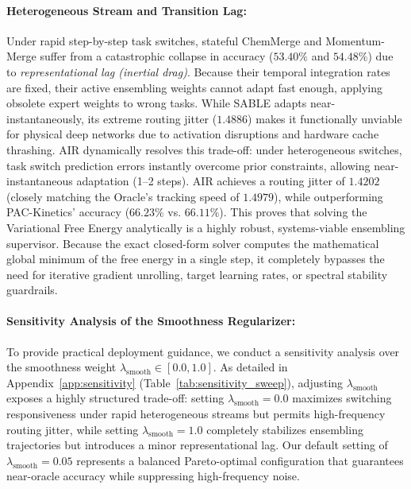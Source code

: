 \paragraph{Heterogeneous Stream and Transition Lag:}
Under rapid step-by-step task switches, stateful ChemMerge and Momentum-Merge suffer from a catastrophic collapse in accuracy ($53.40\%$ and $54.48\%$) due to \emph{representational lag (inertial drag)}. Because their temporal integration rates are fixed, their active ensembling weights cannot adapt fast enough, applying obsolete expert weights to wrong tasks. While SABLE adapts near-instantaneously, its extreme routing jitter ($1.4886$) makes it functionally unviable for physical deep networks due to activation disruptions and hardware cache thrashing. AIR dynamically resolves this trade-off: under heterogeneous switches, task switch prediction errors instantly overcome prior constraints, allowing near-instantaneous adaptation (1--2 steps). AIR achieves a routing jitter of $1.4202$ (closely matching the Oracle's tracking speed of $1.4979$), while outperforming PAC-Kinetics' accuracy ($66.23\%$ vs. $66.11\%$). This proves that solving the Variational Free Energy analytically is a highly robust, systems-viable ensembling supervisor. Because the exact closed-form solver computes the mathematical global minimum of the free energy in a single step, it completely bypasses the need for iterative gradient unrolling, target learning rates, or spectral stability guardrails.

\paragraph{Sensitivity Analysis of the Smoothness Regularizer:}
To provide practical deployment guidance, we conduct a sensitivity analysis over the smoothness weight $\lambda_{\text{smooth}} \in [0.0, 1.0]$. As detailed in Appendix~\ref{app:sensitivity} (Table~\ref{tab:sensitivity_sweep}), adjusting $\lambda_{\text{smooth}}$ exposes a highly structured trade-off: setting $\lambda_{\text{smooth}} = 0.0$ maximizes switching responsiveness under rapid heterogeneous streams but permits high-frequency routing jitter, while setting $\lambda_{\text{smooth}} = 1.0$ completely stabilizes ensembling trajectories but introduces a minor representational lag. Our default setting of $\lambda_{\text{smooth}} = 0.05$ represents a balanced Pareto-optimal configuration that guarantees near-oracle accuracy while suppressing high-frequency noise.

